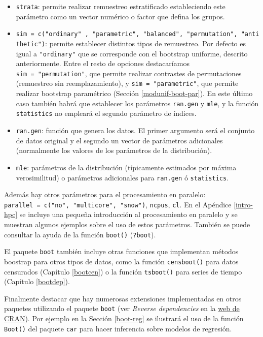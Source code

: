 \documentclass[
]{book}
\theoremstyle{break}
\theoremstyle{definition}
\theoremstyle{definition}
\theoremstyle{definition}
\theoremstyle{definition}
\theoremstyle{remark}
\begin{document}
\begin{itemize}
\item
  \texttt{strata}: permite realizar remuestreo estratificado estableciendo este parámetro
  como un vector numérico o factor que defina los grupos.
\item
  \texttt{sim\ =\ c("ordinary"\ ,\ "parametric",\ "balanced",\ "permutation",\ "antithetic")}:
  permite establecer distintos tipos de remuestreo.
  Por defecto es igual a \texttt{"ordinary"} que se corresponde con el bootstrap uniforme,
  descrito anteriormente. Entre el resto de opciones destacaríamos
  \texttt{sim\ =\ "permutation"}, que permite realizar contrastes de
  permutaciones (remuestreo sin reemplazamiento), y \texttt{sim\ =\ "parametric"},
  que permite realizar bootstrap paramétrico (Sección \ref{modunif-boot-par}).
  En este último caso también habrá que establecer los parámetros \texttt{ran.gen} y
  \texttt{mle}, y la función \texttt{statistics} no empleará el segundo parámetro de índices.
\item
  \texttt{ran.gen}: función que genera los datos. El primer argumento será el conjunto de datos
  original y el segundo un vector de parámetros adicionales
  (normalmente los valores de los parámetros de la distribución).
\item
  \texttt{mle}: parámetros de la distribución (típicamente estimados por máxima verosimilitud)
  o parámetros adicionales para \texttt{ran.gen} ó \texttt{statistics}.
\end{itemize}

Además hay otros parámetros para el procesamiento en paralelo: \texttt{parallel\ =\ c("no",\ "multicore",\ "snow")}, \texttt{ncpus}, \texttt{cl}.
En el Apéndice \ref{intro-hpc} se incluye una pequeña introducción al procesamiento en paralelo y se muestran algunos ejemplos sobre el uso de estos parámetros.
También se puede consultar la ayuda de la función \texttt{boot()} (\texttt{?boot}).

El paquete \texttt{boot} también incluye otras funciones que implementan métodos
boostrap para otros tipos de datos, como la función \texttt{censboot()} para datos
censurados (Capítulo \ref{bootcen}) o la función \texttt{tsboot()} para series de tiempo (Capítulo \ref{bootdep}).

Finalmente destacar que hay numerosas extensiones implementadas en otros paquetes utilizando el paquete \texttt{boot} (ver \emph{Reverse dependencies} en la \href{https://cran.r-project.org/package=boot}{web de CRAN}).
Por ejemplo en la Sección \ref{boot-reg} se ilustrará el uso de la función \texttt{Boot()} del paquete \texttt{car} para hacer inferencia sobre modelos de regresión.
\end{document}
